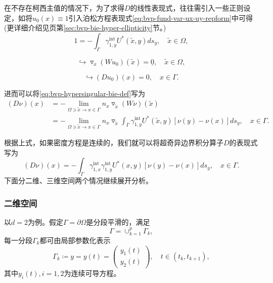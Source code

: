 在不存在柯西主值的情况下，为了求得$D$的线性表现式，往往需引入一些正则设定，如将$u_{0}(x) \equiv 1 $引入泊松方程表现式\eqref{eq:bvp-fund-var-ux-uy-repform}中可得(更详细介绍见\pageref{sec:bvp-bie-hyper-ellipticity}页第\ref{sec:bvp-bie-hyper-ellipticity}节。)
\begin{equation*}
  1 = - \int_{\Gamma} \gamma_{1,y}^{\text{int}} U^{*}(\widetilde{x},y) d s_y, \quad \widetilde{x} \in \Omega,
\end{equation*}

\begin{equation*}
  \hookrightarrow \triangledown_{x} \left( W u_{0} \right)(\widetilde{x}) = \underline{0}, \quad \widetilde{x} \in \Omega,
\end{equation*}

\begin{equation}
  \label{eq:bvp-hyper-bie-D-u0-equiv0}
  \hookrightarrow \left( D u_{0} \right) (x) = 0, \quad x \in \Gamma.
\end{equation}

进而可以将\eqref{eq:bvp-hypersingular-bie-def}写为
\begin{equation*}
  \begin{split}
  \left( D \nu \right)(x)
  &= - \lim_{\Omega \ni \widetilde{x} \rightarrow x \in \Gamma}
  n_x \triangledown_{\widetilde{x}} \left( W \nu \right)(\widetilde{x}) \\
  &= - \lim_{\Omega \ni \widetilde{x} \rightarrow x \in \Gamma}
  n_x \triangledown_{\widetilde{x}}
  \int_{\Gamma}
  \gamma_{1,y}^{\text{int}}
  U^{*}(\widetilde{x}, y)
  \left[ \nu(y) - \nu(x) \right]
  d s_y, \quad x \in \Gamma.
\end{split}
\end{equation*}

根据上式，如果密度方程是连续的，我们就可以将超奇异边界积分算子$D$的表现式写为
\begin{equation}
  \label{eq:bvp-hypersingular-operator-representation-form}
  \left( D \nu \right)(x) =
  - \int_{\Gamma}
  \gamma_{1,x}^{\text{int}}
  \gamma_{1,y}^{\text{int}}
  U^{*}(x,y)
  \left[
  \nu(y) - \nu(x)
  \right]
  d s_y, \quad x \in \Gamma.
\end{equation}
下面分二维、三维空间两个情况继续展开分析。

\subsubsection{二维空间}
\label{sec:bvp-hyperbie-operator-d2}
以$d=2$为例。假定$\Gamma = \partial \Omega$是分段平滑的，满足
\begin{equation*}
  \Gamma = \cup_{k=1}^{p} \Gamma_{k},
\end{equation*}
每一分段$\Gamma_{k}$都可由局部参数化表示
\begin{equation}
  \label{eq:bvp-hypersingular-gamma-k}
  \Gamma_{k} \coloneqq y = y(t) = \begin{pmatrix}
  y_1(t) \\ y_2 (t)
  \end{pmatrix}
  , \quad t \in \left( t_k, t_{k+1} \right),
\end{equation}
其中$y_{i}(t),i=1,2$为连续可导方程。

